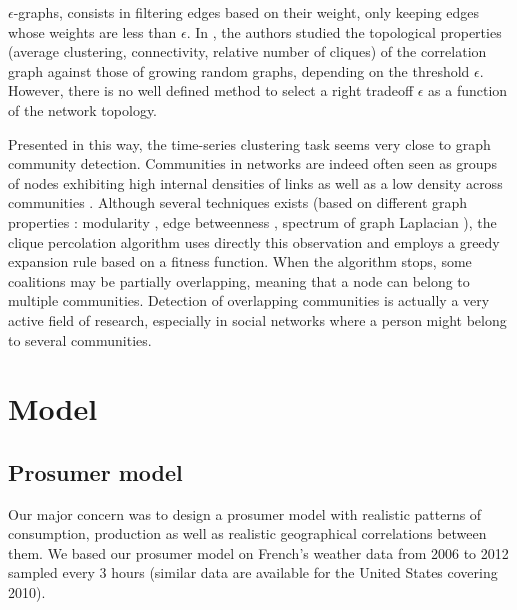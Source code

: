 \documentclass[conference]{IEEEtran}
\begin{document}
$\epsilon$-graphs, consists in filtering edges based on their weight, only keeping edges whose weights are less than $ \epsilon $. In \cite{Garas2008, Onnela2004}, the authors studied the topological properties (average clustering, connectivity, relative number of cliques) of the correlation graph against those of growing random graphs, depending on the threshold $ \epsilon $. However, there is no well defined method to select a right tradeoff $ \epsilon $ as a function of the network topology.

Presented in this way, the time-series clustering task seems very close to graph community detection. Communities in networks are indeed often seen as groups of nodes exhibiting high internal densities of links as well as a low density across communities \cite{Newmanb}. Although several techniques exists (based on different graph properties : modularity \cite{Newmanb}, edge betweenness \cite{Girvan2002}, spectrum of graph Laplacian \cite{Newman}), the clique percolation algorithm \cite{Lancichinetti} uses directly this observation and employs a greedy expansion rule based on a fitness function. When the algorithm stops, some coalitions may be partially overlapping, meaning that a node can belong to multiple communities. Detection of overlapping communities is actually a very active field of research, especially in social networks where a person might belong to several communities.

%
%

\section{Model}
\label{sec:model}
\subsection{Prosumer model}\label{subsec:ProsumerModel}

Our major concern was to design a prosumer model with realistic patterns of consumption, production as well as realistic geographical correlations between them. We based our prosumer model on French's weather data from 2006 to 2012 sampled every 3 hours \cite{Infoclimat} (similar data are available for the United States covering 2010\cite{NCDC}). 
\end{document}
